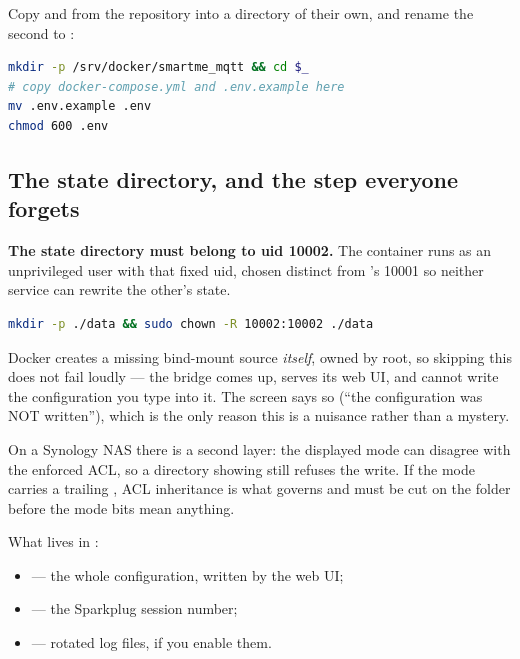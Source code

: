 Copy  and  from the repository into a
directory of their own, and rename the second to :

\begin{lstlisting}[language=bash]
mkdir -p /srv/docker/smartme_mqtt && cd $_
# copy docker-compose.yml and .env.example here
mv .env.example .env
chmod 600 .env
\end{lstlisting}

\subsection{The state directory, and the step everyone forgets}
\label{sec:install-chown}

\begin{warning}
\textbf{The state directory must belong to uid 10002.} The container runs as an
unprivileged user with that fixed uid, chosen distinct from 's 10001 so
neither service can rewrite the other's state.

\begin{lstlisting}[language=bash]
mkdir -p ./data && sudo chown -R 10002:10002 ./data
\end{lstlisting}

Docker creates a missing bind-mount source \emph{itself}, owned by root, so skipping
this does not fail loudly --- the bridge comes up, serves its web UI, and cannot
write the configuration you type into it. The screen says so (``the configuration was
NOT written''), which is the only reason this is a nuisance rather than a mystery.

On a Synology NAS there is a second layer: the displayed mode can disagree with the
enforced ACL, so a directory showing  still refuses the write. If the mode
carries a trailing \code{+}, ACL inheritance is what governs and must be cut on the
folder before the mode bits mean anything.
\end{warning}

What lives in :

\begin{itemize}
  \item {} --- the whole configuration, written by the web UI;
  \item {} --- the Sparkplug session number;
  \item {} --- rotated log files, if you enable them.
\end{itemize}

